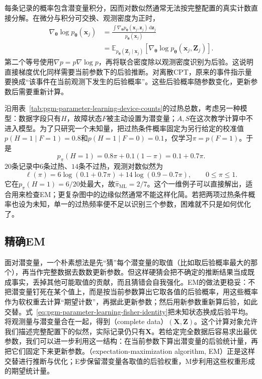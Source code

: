 每条记录的概率包含潜变量积分，因而对数似然通常无法按完整配置的真实计数直接分解。在微分与积分可交换、观测密度为正时，
\begin{equation}
  \begin{aligned}
    \nabla_{\bm{\theta}}\log p_{\bm{\theta}}(\bm{x}_j)
      &=\frac{\int\nabla_{\bm{\theta}}
          p_{\bm{\theta}}(\bm{x}_j,\bm{z}_j)
                  \,\mathrm{d}\bm{z}_j}
             {p_{\bm{\theta}}(\bm{x}_j)}\\
      &=\mathbb{E}_{p_{\bm{\theta}}(\bm{Z}_j\mid\bm{x}_j)}
          [\nabla_{\bm{\theta}}
            \log p_{\bm{\theta}}(\bm{x}_j,\bm{Z}_j)].
  \end{aligned}
  \label{eq:pgm-parameter-learning-fisher-identity}
\end{equation}
第二个等号使用$\nabla p=p\nabla\log p$，再将联合密度除以观测密度识别为后验。这说明直接梯度优化同样需要当前参数下的后验推断。对离散CPT，原来的事件指示量要换成“该事件在当前观测下发生的后验概率”。这些后验概率随参数变化，更新参数后需要重新计算。

沿用表~\ref{tab:pgm-parameter-learning-device-counts}的过热总数，考虑另一种模型：数据字段只有$H$，故障状态$F$被主动设置为潜变量；$A,S$在这次教学计算中不进入模型。为了只研究一个未知量，把过热条件概率固定为另行给定的校准值$p(H=1\mid F=1)=0.8$和$p(H=1\mid F=0)=0.1$，仅学习$\pi=p(F=1)$。于是
\[
  p_\pi(H=1)=0.8\pi+0.1(1-\pi)=0.1+0.7\pi.
\]
$20$条记录中$6$条过热、$14$条不过热，观测对数似然为
\begin{equation}
  \ell(\pi)=6\log(0.1+0.7\pi)
             +14\log(0.9-0.7\pi),\qquad 0\leq\pi\leq1.
  \label{eq:pgm-parameter-learning-device-observed}
\end{equation}
它在$p_\pi(H=1)=6/20$处最大，故$\widehat\pi_{\mathrm{ML}}=2/7$。这个一维例子可以直接解出，适合用来检查EM；更复杂图中的边缘似然通常不能这样化简。若把两项过热条件概率也设为未知，单一的过热频率便不足以识别三个参数，困难就不只是如何优化了。

\subsection{精确EM}
\label{sec:pgm-parameter-learning-em}

面对潜变量，一个朴素想法是先“猜”每个潜变量的取值（比如取后验概率最大的那个），再当作完整数据去数数更新参数。但这样硬猜会把不确定的推断结果当成既成事实，丢掉其他可能取值的贡献，而且猜错会自我强化。EM的做法更稳妥：不把潜变量钉死在某个值上，而是按当前参数算出它取各值的后验概率，用这些概率作为软权重去计算“期望计数”，再据此更新参数；然后用新参数重新算后验，如此交替。式~\eqref{eq:pgm-parameter-learning-fisher-identity}把未知状态换成后验平均。将观测量与潜变量合在一起，得到（complete data）$(\bm{X},\bm{Z})$。这个计算对象允许我们描述完整配置下的似然，实际记录仍只有$\bm{X}$。若给定完全数据后容易求出最优参数，我们可以进一步利用这一结构：在当前参数下算出潜变量的后验统计量，再把它们固定下来更新参数。（expectation-maximization algorithm, EM）正是这样交替进行推断与优化；E步保留潜变量各取值的后验权重，M步利用这些权重形成的期望统计量。


